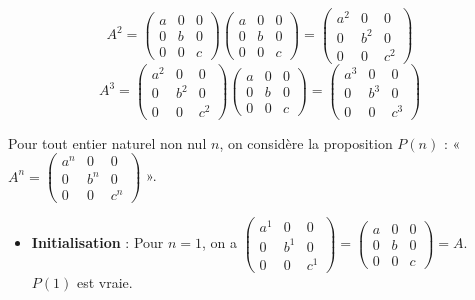 \documentclass[11pt,fleqn]{book} %
\begin{document}
\begin{solution}\[A^2 = \begin{pmatrix}a & 0 & 0 \\0 & b & 0 \\ 0 & 0 & c\end{pmatrix}\begin{pmatrix}a & 0 & 0 \\0 & b & 0 \\ 0 & 0 & c\end{pmatrix} = \begin{pmatrix}a^2 & 0 & 0 \\0 & b^2 & 0 \\ 0 & 0 & c^2\end{pmatrix}\]
\[A^3=\begin{pmatrix}a^2 & 0 & 0 \\0 & b^2 & 0 \\ 0 & 0 & c^2\end{pmatrix}\begin{pmatrix}a & 0 & 0 \\0 & b & 0 \\ 0 & 0 & c\end{pmatrix}=\begin{pmatrix}a^3 & 0 & 0 \\0 & b^3 & 0 \\ 0 & 0 & c^3\end{pmatrix}\]

Pour tout entier naturel non nul \(n\), on considère la proposition \(P(n)\) : « \(A^n=\begin{pmatrix}a^n & 0 & 0 \\0 & b^n & 0 \\ 0 & 0 & c^n\end{pmatrix}\) ».

\begin{itemize}\item \textbf{Initialisation} : Pour \(n=1\), on a \(\begin{pmatrix}a^1 & 0 & 0 \\0 & b^1 & 0 \\ 0 & 0 & c^1\end{pmatrix}=\begin{pmatrix}a & 0 & 0 \\0 & b & 0 \\ 0 & 0 & c\end{pmatrix}=A\). \(P(1)\) est vraie.


\end{itemize}
\end{solution}
\end{document}
